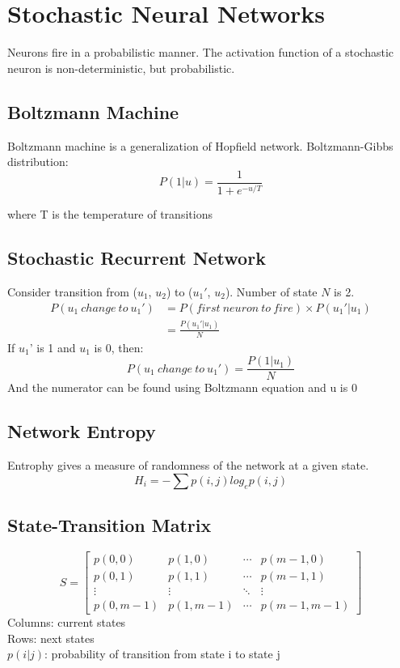\chapter{Stochastic Neural Networks}
Neurons fire in a probabilistic manner. The activation function of a stochastic neuron is non-deterministic, but probabilistic. 

\section{Boltzmann Machine}
Boltzmann machine is a generalization of Hopfield network. Boltzmann-Gibbs distribution:
$$P(1|u)=\frac{1}{1+e^{-u/T}}$$
\begin{center}where T is the temperature of transitions \end{center}

\section{Stochastic Recurrent Network}
Consider transition from ($u_1$, $u_2$) to ($u_1'$, $u_2$). Number of state $N$ is 2.
\begin{equation*}
\begin{split}
P(u_1\ change\ to\ u_1') &= P(first\ neuron\ to\ fire) \times P(u_1' | u_1) \\
&= \frac{P(u_1' | u_1)}{N}
\end{split}
\end{equation*}
If $u_1$' is 1 and $u_1$ is 0, then:
$$P(u_1\ change\ to\ u_1') = \frac{P(1| u_1)}{N}$$
And the numerator can be found using Boltzmann equation and u is 0

\section{Network Entropy}
Entrophy gives a measure of randomness of the network at a given state.
$$H_i=-\sum{p(i,j)log_e p(i,j)}$$

\section{State-Transition Matrix}
$$
S = 
\begin{bmatrix}
p(0,0) & p(1,0) & \cdots & p(m-1, 0) \\
p(0,1) & p(1,1) & \cdots & p(m-1, 1) \\
\vdots & \vdots & \ddots & \vdots \\
p(0,m-1) & p(1,m-1) & \cdots & p(m-1,m-1)
\end{bmatrix}
$$
Columns: current states \\
Rows: next states \\
$p(i|j)$: probability of transition from state i to state j

